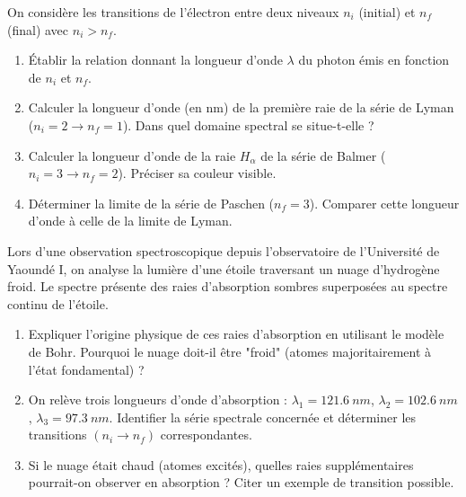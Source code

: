 \documentclass[11pt]{article}
\begin{document}
\begin{exercice}
On considère les transitions de l'électron entre deux niveaux $n_i$ (initial) et $n_f$ (final) avec $n_i > n_f$.
\begin{enumerate}
    \item Établir la relation donnant la longueur d'onde $\lambda$ du photon émis en fonction de $n_i$ et $n_f$.
    \item Calculer la longueur d'onde (en \si{nm}) de la première raie de la série de Lyman ($n_i=2 \to n_f=1$). Dans quel domaine spectral se situe-t-elle ?
    \item Calculer la longueur d'onde de la raie $H_\alpha$ de la série de Balmer ($n_i=3 \to n_f=2$). Préciser sa couleur visible.
    \item Déterminer la limite de la série de Paschen ($n_f=3$). Comparer cette longueur d'onde à celle de la limite de Lyman.
\end{enumerate}
\end{exercice}

\begin{exercice}
Lors d'une observation spectroscopique depuis l'observatoire de l'Université de Yaoundé I, on analyse la lumière d'une étoile traversant un nuage d'hydrogène froid. Le spectre présente des raies d'absorption sombres superposées au spectre continu de l'étoile.
\begin{enumerate}
    \item Expliquer l'origine physique de ces raies d'absorption en utilisant le modèle de Bohr. Pourquoi le nuage doit-il être "froid" (atomes majoritairement à l'état fondamental) ?
    \item On relève trois longueurs d'onde d'absorption : $\lambda_1 = \SI{121,6}{nm}$, $\lambda_2 = \SI{102,6}{nm}$, $\lambda_3 = \SI{97,3}{nm}$. Identifier la série spectrale concernée et déterminer les transitions $(n_i \to n_f)$ correspondantes.
    \item Si le nuage était chaud (atomes excités), quelles raies supplémentaires pourrait-on observer en absorption ? Citer un exemple de transition possible.
\end{enumerate}
\end{exercice}
\end{document}
